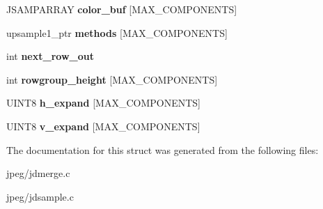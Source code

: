 \begin{DoxyCompactItemize}
\item 
J\+S\+A\+M\+P\+A\+R\+R\+AY {\bfseries color\+\_\+buf} \mbox{[}M\+A\+X\+\_\+\+C\+O\+M\+P\+O\+N\+E\+N\+TS\mbox{]}\hypertarget{structmy__upsampler_a72da5ad87430b974aeabce55c30eb653}{}\label{structmy__upsampler_a72da5ad87430b974aeabce55c30eb653}

\item 
upsample1\+\_\+ptr {\bfseries methods} \mbox{[}M\+A\+X\+\_\+\+C\+O\+M\+P\+O\+N\+E\+N\+TS\mbox{]}\hypertarget{structmy__upsampler_a3f1f669c2871ccaee6009ec6f96899d3}{}\label{structmy__upsampler_a3f1f669c2871ccaee6009ec6f96899d3}

\item 
int {\bfseries next\+\_\+row\+\_\+out}\hypertarget{structmy__upsampler_a9e77765267bd21be6cb005b748034d76}{}\label{structmy__upsampler_a9e77765267bd21be6cb005b748034d76}

\item 
int {\bfseries rowgroup\+\_\+height} \mbox{[}M\+A\+X\+\_\+\+C\+O\+M\+P\+O\+N\+E\+N\+TS\mbox{]}\hypertarget{structmy__upsampler_a05806e1394a2638e4912da137b9d4bcd}{}\label{structmy__upsampler_a05806e1394a2638e4912da137b9d4bcd}

\item 
U\+I\+N\+T8 {\bfseries h\+\_\+expand} \mbox{[}M\+A\+X\+\_\+\+C\+O\+M\+P\+O\+N\+E\+N\+TS\mbox{]}\hypertarget{structmy__upsampler_a4a82028e54b1f7e57b2c1f7d63290f65}{}\label{structmy__upsampler_a4a82028e54b1f7e57b2c1f7d63290f65}

\item 
U\+I\+N\+T8 {\bfseries v\+\_\+expand} \mbox{[}M\+A\+X\+\_\+\+C\+O\+M\+P\+O\+N\+E\+N\+TS\mbox{]}\hypertarget{structmy__upsampler_a48df5e8df66ba2f1275f54a617eaf888}{}\label{structmy__upsampler_a48df5e8df66ba2f1275f54a617eaf888}

\end{DoxyCompactItemize}


The documentation for this struct was generated from the following files\+:\begin{DoxyCompactItemize}
\item 
jpeg/jdmerge.\+c\item 
jpeg/jdsample.\+c\end{DoxyCompactItemize}
